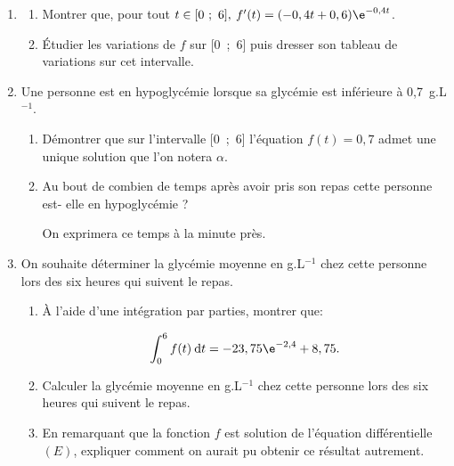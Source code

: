 \medskip

\begin{enumerate}
\item
	\begin{enumerate}
		\item Montrer que, pour tout $t \in [0~;~6],\: f'(t) = (- 0,4t + 0,6)\e^{-0,4t}$.
		\item Étudier les variations de $f$ sur [0~;~6] puis dresser son tableau de variations sur cet intervalle.
	\end{enumerate}
\item Une personne est en hypoglycémie lorsque sa glycémie est inférieure à 0,7~g.L$^{-1}$.
	\begin{enumerate}
		\item Démontrer que sur l'intervalle [0~;~6] l'équation $f(t) = 0,7$ admet une unique
solution que l'on notera $\alpha$.
		\item Au bout de combien de temps après avoir pris son repas cette personne est-
elle en hypoglycémie ?

On exprimera ce temps à la minute près.
	\end{enumerate}
\item On souhaite déterminer la glycémie moyenne en g.L$^{-1}$ chez cette personne lors des six heures qui suivent le repas.
	\begin{enumerate}
		\item À l'aide d'une intégration par parties, montrer que:

\[\displaystyle\int_0^6 f(t)\: \text{d}t = - 23,75\e^{-2,4} + 8,75.\]

		\item Calculer la glycémie moyenne en g.L$^{-1}$ chez cette personne lors des six heures qui suivent le repas.
		\item En remarquant que la fonction $f$ est solution de l'équation différentielle $(E)$, expliquer comment on aurait pu obtenir ce résultat autrement.
	\end{enumerate}
\end{enumerate}

\bigskip
